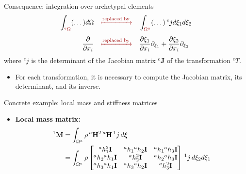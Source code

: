 \documentclass[aspectratio=169]{beamer}
\begin{document}
{\begin{frame}{Consequence: integration over archetypal elements}
  \begin{align*}
    \int_{{\color{darkred}{}^e\Omega}}(\dots)d\Omega & \quad{\color{darkred}\xmapsto[]{\text{replaced by}}}\quad\int_{{\color{darkred}\Omega{}^a}}(\dots)\, {}^ej d\xi_1d\xi_2                                         \\[5pt]
    \frac{\partial}{\partial x_i}                    & \quad{\color{darkred}\xmapsto[]{\text{replaced by}}}\quad\frac{\partial\xi_1}{\partial x_i}\partial_{\xi_1}+ \frac{\partial\xi_2}{\partial x_i}\partial_{\xi_2}
  \end{align*}
  where ${}^ej$ is the determinant of the Jacobian matrix ${}^e\mathbf J$ of the transformation ${}^eT$.
  \vspace{0.2cm}
  \begin{tcolorbox}[colback=darkred!10,colframe=darkred!40!black,]
    \begin{itemize}
      \item[\HandRight] For each transformation, it is necessary to compute the Jacobian matrix, its determinant, and its inverse.
    \end{itemize}
  \end{tcolorbox}
\end{frame}

\begin{frame}{Concrete example: local mass and stiffness matrices}
  \begin{itemize}
    \item\textbf{Local mass matrix:}
          \begin{align*}
            {}^1\mathbf M & =\int_{\Omega^a} \rho\, {}^a\mathbf H^T{}^a\mathbf H \, {}^1j \, d\boldsymbol\xi                                 \\
                          & = \int_{\Omega^a} \rho\begin{bmatrix}
                                                    {}^a h_1^2 \mathbf I      & {}^a h_1{}^a h_2 \mathbf I & {}^a h_1{}^a h_3 \mathbf I \\
                                                    {}^ah_2{}^a h_1 \mathbf I & {}^a h_2^2 \mathbf I       & {}^a h_2{}^a h_3 \mathbf I \\
                                                    {}^ah_3{}^a h_1 \mathbf I & {}^a h_3{}^a h_2 \mathbf I & {}^a h_3^2 \mathbf I       \\
                                                  \end{bmatrix} \, {}^1j \, d\xi_2d\xi_1
          \end{align*}


\end{itemize}
\end{frame}}
\end{document}
